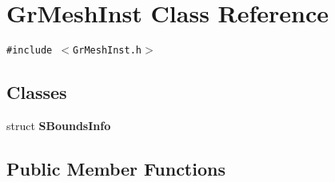 \hypertarget{class_gr_mesh_inst}{
\section{GrMeshInst Class Reference}
\label{class_gr_mesh_inst}
}
{\tt \#include $<$GrMeshInst.h$>$}

\subsection*{Classes}
\begin{CompactItemize}
\item 
struct \textbf{SBoundsInfo}
\end{CompactItemize}
\subsection*{Public Member Functions}
